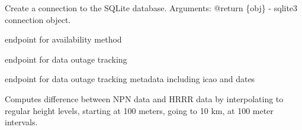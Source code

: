 \documentclass[letterpaper,10pt,english]{sphinxmanual}
\begin{document}
\begin{fulllineitems}
\label{\detokenize{index:compare_npn_to_model.connect_db}}
Create a connection to the SQLite database.
Arguments:
@return \{obj\} - sqlite3 connection object.

\end{fulllineitems}


\begin{fulllineitems}
\label{\detokenize{index:compare_npn_to_model.data_availability}}
endpoint for availability method

\end{fulllineitems}


\begin{fulllineitems}
\label{\detokenize{index:compare_npn_to_model.data_outages}}
endpoint for data outage tracking

\end{fulllineitems}


\begin{fulllineitems}
\label{\detokenize{index:compare_npn_to_model.data_outages_metadata}}
endpoint for data outage tracking metadata including icao and dates

\end{fulllineitems}


\begin{fulllineitems}
\label{\detokenize{index:compare_npn_to_model.difference}}
Computes difference between NPN data and HRRR data by interpolating to 
regular height levels, starting at 100 meters, going to 10 km, at 100 meter intervals.

\end{fulllineitems}
\end{document}
